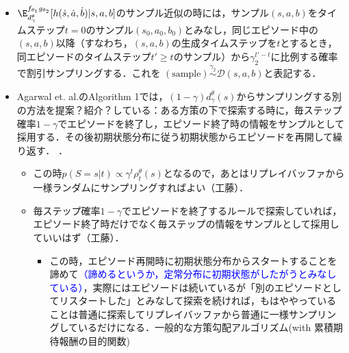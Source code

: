 \documentclass[a4paper,10pt,dvipdfmx]{jsarticle}
\begin{document}
\begin{itemize}

    \item $\E_{d_{\gamma}^{\theta}}^{f_{\theta_1}g_{\theta_2}}[h(\dot{s},\dot{a},\dot{b})|s,a,b]$のサンプル近似の時には，サンプル$(s,a,b)$をタイムステップ$t=0$のサンプル$(s_0,a_0,b_0)$とみなし，同じエピソード中の$(s,a,b)$以降（すなわち，$(s,a,b)$の生成タイムステップを$t$とするとき，同エピソードのタイムステップ$t'\ge t$のサンプル）から$\gamma_2^{t'-t}$に比例する確率で割引サンプリングする．これを $\mathrm{(sample)}\overset{\gamma_2}{\sim}\mathcal{D}(s,a,b)$と表記する．
    \item Agarwal et. al.\cite{Agarwal2021-nc}のAlgorithm 1では，$(1-\gamma)d_{\gamma}^{\theta}(s)$からサンプリングする別の方法を提案？紹介？している：ある方策の下で探索する時に，毎ステップ確率$1-\gamma$でエピソードを終了し，エピソード終了時の情報をサンプルとして採用する．その後初期状態分布に従う初期状態からエピソードを再開して繰り返す．
    \cite{Agarwal2021-nc}．
    \begin{itemize}
        \item この時$p(S=s|t)\propto\gamma^t\rho_t^\theta(s)$となるので，あとはリプレイバッファから一様ランダムにサンプリングすればよい（工藤）．
        \item 毎ステップ確率$1-\gamma$でエピソードを終了するルールで探索していれば，エピソード終了時だけでなく毎ステップの情報をサンプルとして採用していいはず（工藤）．
        \begin{itemize}
            \item この時，エピソード再開時に初期状態分布からスタートすることを諦めて\textcolor{blue}{（諦めるというか，定常分布に初期状態がしたがうとみなしている）}，実際にはエピソードは続いているが「別のエピソードとしてリスタートした」とみなして探索を続ければ，もはややっていることは普通に探索してリプレイバッファから普通に一様サンプリングしているだけになる．一般的な方策勾配アルゴリズム(with 累積期待報酬の目的関数)

\end{itemize}
\end{itemize}
\end{itemize}
\end{document}
